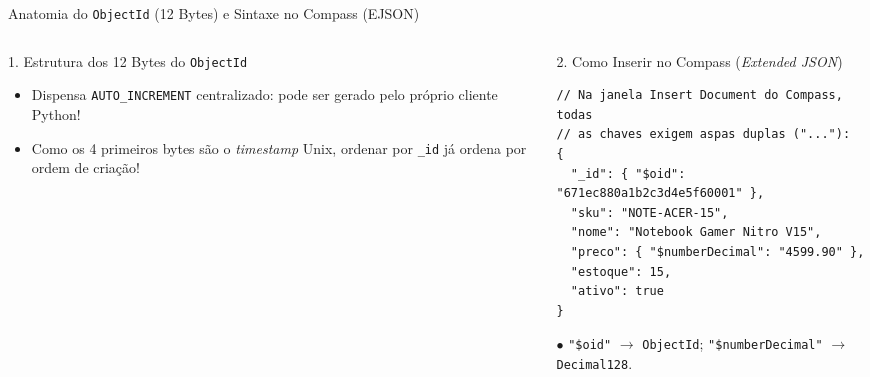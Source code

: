 \begin{frame}[fragile]{Anatomia do \texttt{ObjectId} (12 Bytes) e Sintaxe no Compass (EJSON)}
  \vspace{0.05cm}
  \begin{columns}[t]
    \begin{column}{0.48\textwidth}
      \alert{1. Estrutura dos 12 Bytes do \texttt{ObjectId}}\par
      \vspace{0.08cm}
      \begin{center}
      \end{center}
      \vspace{0.05cm}
      \scriptsize
      \begin{itemize}
        \item Dispensa \texttt{AUTO\_INCREMENT} centralizado: pode ser gerado pelo próprio cliente Python!
        \item Como os 4 primeiros bytes são o \textit{timestamp} Unix, ordenar por \texttt{\_id} já ordena por ordem de criação!
      \end{itemize}
    \end{column}
    \begin{column}{0.48\textwidth}
      \alert{2. Como Inserir no Compass (\textit{Extended JSON})}\par
      \begin{lstlisting}[language=mongosh]
// Na janela Insert Document do Compass, todas
// as chaves exigem aspas duplas ("..."):
{
  "_id": { "$oid": "671ec880a1b2c3d4e5f60001" },
  "sku": "NOTE-ACER-15",
  "nome": "Notebook Gamer Nitro V15",
  "preco": { "$numberDecimal": "4599.90" },
  "estoque": 15,
  "ativo": true
}
      \end{lstlisting}
      \scriptsize
      $\bullet$ \texttt{"\$oid"} $\to$ \texttt{ObjectId}; \texttt{"\$numberDecimal"} $\to$ \texttt{Decimal128}.
    \end{column}
  \end{columns}
\end{frame}
